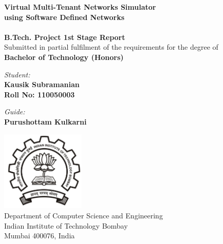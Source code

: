 \begin{titlepage}
\begin{center}

{\Huge \bfseries
Virtual Multi-Tenant Networks Simulator \\
using Software Defined Networks\\
}~\\[1cm]


{\large \bfseries
B.Tech. Project 1st Stage Report
}~\\[0.40cm]

{
Submitted in partial fulfilment of the requirements for the degree of
}~\\[0.20cm]

{\large \bfseries
Bachelor of Technology (Honors)
}\\[2.75cm]
\end{center}

\begin{multicols}{2}
\begin{flushleft}
{\large
\textit{Student:} \\
\textbf{Kausik Subramanian	} \\
\textbf{Roll No: 110050003}
}
\end{flushleft}
\columnbreak
\begin{flushright}
{\large
\textit{Guide:} \\
\textbf{Purushottam Kulkarni}
}
\end{flushright}
\end{multicols}

\vfill

\begin{center}
\includegraphics[width=4cm]{Figures/iitbblack.jpg}~\\[1cm]

{\large
Department of Computer Science and Engineering\\
Indian Institute of Technology Bombay\\
Mumbai 400076, India\\
}

\end{center}
\end{titlepage}